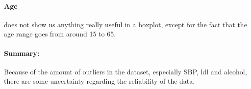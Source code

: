 \paragraph{Age} does not show us anything really useful in a boxplot, except for the fact that the age range goes from around 15 to 65.

\paragraph{Summary:} Because of the amount of outliers in the dataset, especially SBP, ldl and alcohol, there are some uncertainty regarding the reliability of the data.

